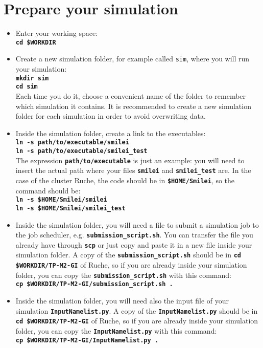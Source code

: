 \documentclass{article}
\newcommand{\commandline}[1]{\texttt{\textbf{#1}}}
\begin{document}
\section{Prepare your simulation}
\begin{itemize}


\item Enter your working space:\\
\commandline{cd \$WORKDIR}

\item Create a new simulation folder, for example called \texttt{sim}, where you will run your simulation:\\
\commandline{mkdir sim}\\
\commandline{cd sim}\\
Each time you do it, choose a convenient name of the folder to remember which simulation it contains.
It is recommended to create a new simulation folder for each simulation in order to avoid overwriting data.

\item Inside the simulation folder, create a link to the executables:\\
\commandline{ln -s path/to/executable/smilei}\\
\commandline{ln -s path/to/executable/smilei\_test}\\
The expression \commandline{path/to/executable} is just an example: you will need to insert the actual path where your files \commandline{smilei} and \commandline{smilei\_test} are.
In the case of the cluster Ruche, the code should be in \commandline{\$HOME/Smilei}, so the command should be:\\
\commandline{ln -s \$HOME/Smilei/smilei}\\
\commandline{ln -s \$HOME/Smilei/smilei\_test}

\item Inside the simulation folder, you will need a file to submit a simulation job to the job scheduler, e.g. \commandline{submission\_script.sh}. You can transfer the file you already have through \commandline{scp} or just copy and paste it in a new file inside your simulation folder. 
A copy of the \commandline{submission\_script.sh} should be in \commandline{cd \$WORKDIR/TP-M2-GI} of Ruche, so if you are already inside your simulation folder, you can copy the \commandline{submission\_script.sh} with this command:\\
\commandline{cp \$WORKDIR/TP-M2-GI/submission\_script.sh .}

\item Inside the simulation folder, you will need also the input file of your simulation \commandline{InputNamelist.py}. 
A copy of the \commandline{InputNamelist.py} should be in \commandline{cd \$WORKDIR/TP-M2-GI} of Ruche, so if you are already inside your simulation folder, you can copy the \commandline{InputNamelist.py} with this command:\\
\commandline{cp \$WORKDIR/TP-M2-GI/InputNamelist.py .}\\


\end{itemize}
\end{document}
